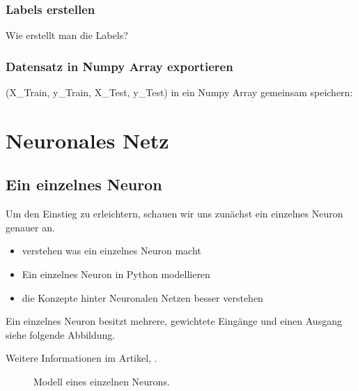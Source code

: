 \documentclass[letterpaper,10pt,english]{jupyterBook}
\let\sphinxpxdimen\pdfpxdimen\else\newdimen\sphinxpxdimen
\begin{document}
\section{Labels erstellen}
\label{\detokenize{01_Bilderdatenbank/imagedatagen:labels-erstellen}}
\sphinxAtStartPar
Wie erstellt man die Labels?


\section{Datensatz in Numpy Array exportieren}
\label{\detokenize{01_Bilderdatenbank/imagedatagen:datensatz-in-numpy-array-exportieren}}
\sphinxAtStartPar
(X\_Train, y\_Train, X\_Test, y\_Test) in ein Numpy Array gemeinsam speichern:


\part{Neuronales Netz}


\chapter{Ein einzelnes Neuron}
\label{\detokenize{02_NN/einzelnes_neuron:ein-einzelnes-neuron}}\label{\detokenize{02_NN/einzelnes_neuron::doc}}
\sphinxAtStartPar
Um den Einstieg zu erleichtern, schauen wir uns zunächst ein einzelnes Neuron genauer an.

\sphinxAtStartPar
{}
\begin{itemize}
\item {} 
\sphinxAtStartPar
verstehen was ein einzelnes Neuron macht

\item {} 
\sphinxAtStartPar
Ein einzelnes Neuron in Python modellieren

\item {} 
\sphinxAtStartPar
die Konzepte hinter Neuronalen Netzen besser verstehen

\end{itemize}

\sphinxAtStartPar
Ein einzelnes Neuron besitzt mehrere, gewichtete Eingänge und einen Ausgang siehe folgende Abbildung.

\sphinxAtStartPar
Weitere Informationen im Artikel,
.

\begin{figure}[htbp]
\centering
\capstart

\noindent\sphinxincludegraphics[width=1000\sphinxpxdimen]{{neuron}.png}
\caption{Modell eines einzelnen Neurons.}\label{\detokenize{02_NN/einzelnes_neuron:markdown-fig}}\end{figure}
\end{document}
